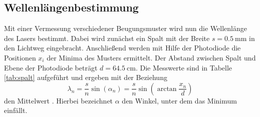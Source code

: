 \subsection{Wellenlängenbestimmung}
\label{subsec:wellenlänge}
Mit einer Vermessung verschiedener Beugungsmuster wird nun die Wellenlänge des
Lasers bestimmt.
Dabei wird zunächst ein Spalt mit der Breite $s = \SI{0.5}{\milli\meter}$ in den Lichtweg eingebracht.
Anschließend werden mit Hilfe der Photodiode die Positionen $x_i$ der Minima des Musters ermittelt.
Der Abstand zwischen Spalt und Ebene der Photodiode beträgt $d = \SI{64.5}{\centi\meter}$.
Die Messwerte sind in Tabelle \ref{tab:spalt} aufgeführt und ergeben mit der Beziehung
\begin{equation}
    \label{eq:spalt}
    \lambda_n = \frac{s}{n}\sin\!\left(\alpha_n\right) = \frac{s}{n}\sin\!\left(\arctan\frac{x_n}{d}\right)
\end{equation}
den Mittelwert \unskip.
Hierbei bezeichnet $\alpha$ den Winkel, unter dem das Minimum einfällt.

